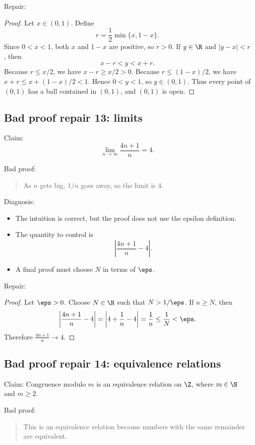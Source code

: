 Repair:

\begin{proof}
Let $x\in(0,1)$. Define
\[
r=\frac12\min\{x,1-x\}.
\]
Since $0<x<1$, both $x$ and $1-x$ are positive, so $r>0$. If $y\in\R$ and $|y-x|<r$, then
\[
x-r<y<x+r.
\]
Because $r\leq x/2$, we have $x-r\geq x/2>0$. Because $r\leq(1-x)/2$, we have $x+r\leq x+(1-x)/2<1$. Hence $0<y<1$, so $y\in(0,1)$. Thus every point of $(0,1)$ has a ball contained in $(0,1)$, and $(0,1)$ is open.
\end{proof}

\subsection{Bad proof repair 13: limits}

Claim:
\[
\lim_{n\to\infty}\frac{4n+1}{n}=4.
\]

Bad proof:

\begin{quote}
As $n$ gets big, $1/n$ goes away, so the limit is $4$.
\end{quote}

Diagnosis:

\begin{itemize}
\item The intuition is correct, but the proof does not use the epsilon definition.
\item The quantity to control is
\[
\left|\frac{4n+1}{n}-4\right|.
\]
\item A final proof must choose $N$ in terms of $\eps$.
\end{itemize}

Repair:

\begin{proof}
Let $\eps>0$. Choose $N\in\N$ such that $N>1/\eps$. If $n\geq N$, then
\[
\left|\frac{4n+1}{n}-4\right|=\left|4+\frac1n-4\right|=\frac1n\leq\frac1N<\eps.
\]
Therefore $\frac{4n+1}{n}\to4$.
\end{proof}

\subsection{Bad proof repair 14: equivalence relations}

Claim: Congruence modulo $m$ is an equivalence relation on $\Z$, where $m\in\N$ and $m\geq2$.

Bad proof:

\begin{quote}
This is an equivalence relation because numbers with the same remainder are equivalent.
\end{quote}

